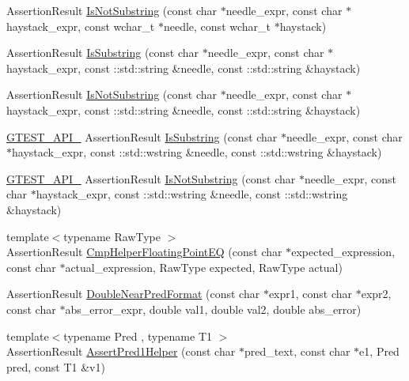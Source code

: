 \begin{DoxyCompactItemize}
\item 
\-Assertion\-Result \hyperlink{namespacetesting_ae7bf7bebcf58a8ade5f13be1c274db1d}{\-Is\-Not\-Substring} (const char $\ast$needle\-\_\-expr, const char $\ast$haystack\-\_\-expr, const wchar\-\_\-t $\ast$needle, const wchar\-\_\-t $\ast$haystack)
\item 
\-Assertion\-Result \hyperlink{namespacetesting_af277c788bf038cc9fd0baf33862f693d}{\-Is\-Substring} (const char $\ast$needle\-\_\-expr, const char $\ast$haystack\-\_\-expr, const \-::std\-::string \&needle, const \-::std\-::string \&haystack)
\item 
\-Assertion\-Result \hyperlink{namespacetesting_a82240dc86e7ace0508ad37a2ac7f019b}{\-Is\-Not\-Substring} (const char $\ast$needle\-\_\-expr, const char $\ast$haystack\-\_\-expr, const \-::std\-::string \&needle, const \-::std\-::string \&haystack)
\item 
\hyperlink{gtest-port_8h_aa73be6f0ba4a7456180a94904ce17790}{\-G\-T\-E\-S\-T\-\_\-\-A\-P\-I\-\_\-} \-Assertion\-Result \hyperlink{namespacetesting_a2ff5c4d0c112d92b20232bd0cf173904}{\-Is\-Substring} (const char $\ast$needle\-\_\-expr, const char $\ast$haystack\-\_\-expr, const \-::std\-::wstring \&needle, const \-::std\-::wstring \&haystack)
\item 
\hyperlink{gtest-port_8h_aa73be6f0ba4a7456180a94904ce17790}{\-G\-T\-E\-S\-T\-\_\-\-A\-P\-I\-\_\-} \-Assertion\-Result \hyperlink{namespacetesting_a2205435db77abd191fb8209bba41862a}{\-Is\-Not\-Substring} (const char $\ast$needle\-\_\-expr, const char $\ast$haystack\-\_\-expr, const \-::std\-::wstring \&needle, const \-::std\-::wstring \&haystack)
\item 
{\footnotesize template$<$typename Raw\-Type $>$ }\\\-Assertion\-Result \hyperlink{namespacetesting_1_1internal_aaa7317360b59d9ebc020e240aaadd516}{\-Cmp\-Helper\-Floating\-Point\-E\-Q} (const char $\ast$expected\-\_\-expression, const char $\ast$actual\-\_\-expression, \-Raw\-Type expected, \-Raw\-Type actual)
\item 
\-Assertion\-Result \hyperlink{namespacetesting_1_1internal_a44c08eb9054d3bf89ac3e7ac0549929f}{\-Double\-Near\-Pred\-Format} (const char $\ast$expr1, const char $\ast$expr2, const char $\ast$abs\-\_\-error\-\_\-expr, double val1, double val2, double abs\-\_\-error)
\item 
{\footnotesize template$<$typename Pred , typename T1 $>$ }\\\-Assertion\-Result \hyperlink{namespacetesting_a7f73180474723be6e92185d6fa9e7c9f}{\-Assert\-Pred1\-Helper} (const char $\ast$pred\-\_\-text, const char $\ast$e1, \-Pred pred, const \-T1 \&v1)

\end{DoxyCompactItemize}
